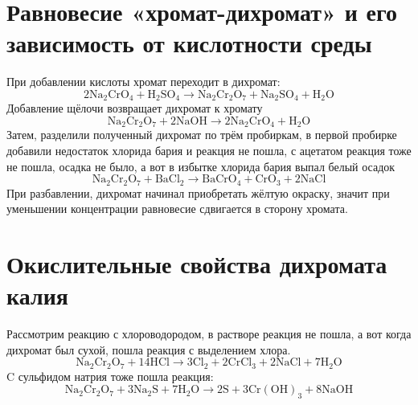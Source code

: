 \documentclass[a4paper,12pt]{article}
\begin{document}
\section{Равновесие «хромат-дихромат» и его зависимость от кислотности среды}
При добавлении кислоты хромат переходит в дихромат:
\begin{equation} 
\mathrm{2Na_2CrO_4 + H_2SO_4 \longrightarrow Na_2Cr_2O_7 + Na_2SO_4+H_2O }
\end{equation}
Добавление щёлочи возвращает дихромат к хромату
\begin{equation} 
\mathrm{Na_2Cr_2O_7 + 2NaOH \longrightarrow 2Na_2CrO_4 +H_2O }
\end{equation}
Затем, разделили полученный дихромат по трём пробиркам, в первой пробирке добавили недостаток хлорида бария и реакция не пошла, с ацетатом реакция тоже не пошла, осадка не было, а вот в избытке хлорида бария выпал белый осадок
\begin{equation} 
\mathrm{Na_2Cr_2O_7 + BaCl_2 \longrightarrow BaCrO_4 + CrO_3 + 2NaCl}
\end{equation}
При разбавлении, дихромат начинал приобретать жёлтую окраску, значит при уменьшении концентрации равновесие сдвигается в сторону хромата.
\section{Окислительные свойства дихромата калия}
Рассмотрим реакцию с хлороводородом, в растворе реакция не пошла, а вот когда дихромат был сухой, пошла реакция с выделением хлора.
\begin{equation} 
\mathrm{Na_2Cr_2O_7 + 14HCl \longrightarrow 3Cl_2 + 2CrCl_3 + 2NaCl + 7H_2O }
\end{equation}
C  сульфидом натрия тоже пошла реакция:
\begin{equation} 
\mathrm{Na_2Cr_2O_7 + 3Na_2S + 7H_2O \longrightarrow 2S + 3Cr(OH)_3 + 8NaOH }
\end{equation}
\end{document}
